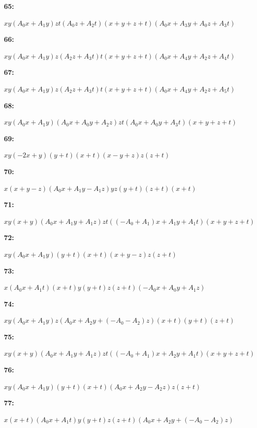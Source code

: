 \documentclass[12pt]{amsart}
\theoremstyle{plain}
\theoremstyle{remark}
\theoremstyle{definition}
\numberwithin{table}{section}
\begin{document}
\noindent\parbox[right]{9mm}{\textbf{65:}}\parbox{3mm}{\hfill}%
\parbox[t]{15cm}{\(xy(A_{0}x + A_{1}y)zt(A_{0}z + A_{2}t)(x + y + z + t)(A_{0}x + A_{3}y + A_{0}z + A_{3}t)\)}

\noindent\parbox[right]{9mm}{\textbf{66:}}\parbox{3mm}{\hfill}%
\parbox[t]{15cm}{\(xy(A_{0}x + A_{1}y)z(A_{2}z + A_{3}t)t(x + y + z + t)(A_{0}x + A_{4}y + A_{2}z + A_{4}t)\)}

\noindent\parbox[right]{9mm}{\textbf{67:}}\parbox{3mm}{\hfill}%
\parbox[t]{15cm}{\(xy(A_{0}x + A_{1}y)z(A_{2}z + A_{3}t)t(x + y + z + t)(A_{0}x + A_{4}y + A_{2}z + A_{5}t)\)}

\noindent\parbox[right]{9mm}{\textbf{68:}}\parbox{3mm}{\hfill}%
\parbox[t]{15cm}{\(xy(A_{0}x + A_{1}y)(A_{0}x + A_{0}y + A_{2}z)zt(A_{0}x + A_{0}y + A_{3}t)(x + y + z + t)\)}

\noindent\parbox[right]{9mm}{\textbf{69:}}\parbox{3mm}{\hfill}%
\parbox[t]{15cm}{\(xy(-2x + y)(y + t)(x + t)(x - y + z)z(z + t)\)}

\noindent\parbox[right]{9mm}{\textbf{70:}}\parbox{3mm}{\hfill}%
\parbox[t]{15cm}{\(x(x + y - z)(A_{0}x + A_{1}y - A_{1}z)yz(y + t)(z + t)(x + t)\)}

\noindent\parbox[right]{9mm}{\textbf{71:}}\parbox{3mm}{\hfill}%
\parbox[t]{15cm}{\(xy(x + y)(A_{0}x + A_{1}y + A_{1}z)zt((-A_{0} + A_{1})x + A_{1}y + A_{1}t)(x + y + z + t)\)}

\noindent\parbox[right]{9mm}{\textbf{72:}}\parbox{3mm}{\hfill}%
\parbox[t]{15cm}{\(xy(A_{0}x + A_{1}y)(y + t)(x + t)(x + y - z)z(z + t)\)}

\noindent\parbox[right]{9mm}{\textbf{73:}}\parbox{3mm}{\hfill}%
\parbox[t]{15cm}{\(x(A_{0}x + A_{1}t)(x + t)y(y + t)z(z + t)(-A_{0}x + A_{0}y + A_{1}z)\)}

\noindent\parbox[right]{9mm}{\textbf{74:}}\parbox{3mm}{\hfill}%
\parbox[t]{15cm}{\(xy(A_{0}x + A_{1}y)z(A_{0}x + A_{2}y + (-A_{0} - A_{2})z)(x + t)(y + t)(z + t)\)}

\noindent\parbox[right]{9mm}{\textbf{75:}}\parbox{3mm}{\hfill}%
\parbox[t]{15cm}{\(xy(x + y)(A_{0}x + A_{1}y + A_{1}z)zt((-A_{0} + A_{1})x + A_{2}y + A_{1}t)(x + y + z + t)\)}

\noindent\parbox[right]{9mm}{\textbf{76:}}\parbox{3mm}{\hfill}%
\parbox[t]{15cm}{\(xy(A_{0}x + A_{1}y)(y + t)(x + t)(A_{0}x + A_{2}y - A_{2}z)z(z + t)\)}

\noindent\parbox[right]{9mm}{\textbf{77:}}\parbox{3mm}{\hfill}%
\parbox[t]{15cm}{\(x(x + t)(A_{0}x + A_{1}t)y(y + t)z(z + t)(A_{0}x + A_{2}y + (-A_{0} - A_{2})z)\)}
\end{document}
